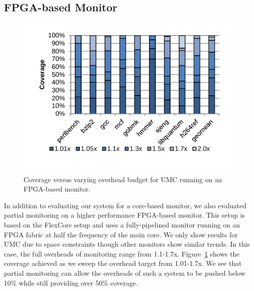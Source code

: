 \subsection{FPGA-based Monitor}
\label{sec:evaluation.fpga}

\begin{figure}
  \begin{center}
    \vspace{-0.1in}
    \includegraphics[width=\linewidth, clip=true, trim=0 0.3in 0 0.1in]{figs/data_fpga_umc_sweep.pdf}
    \vspace{-0.2in}
    \caption{Coverage versus varying overhead budget for UMC running on an FPGA-based monitor.}
    \label{fig:evaluation.fpga_umc_sweep}
    \vspace{-0.1in}
  \end{center}
\end{figure}

In addition to evaluating our system for a core-based monitor, we also
evaluated partial monitoring on a higher performance FPGA-based monitor. This
setup is based on the FlexCore \cite{flexcore-micro10} setup and uses a
fully-pipelined monitor running on an FPGA fabric at half the frequency of the
main core. We only show results for UMC due to space constraints though other
monitors show similar trends. In this case, the full overheads of
monitoring range from 1.1-1.7x. Figure~\ref{fig:evaluation.fpga_umc_sweep} shows
the coverage achieved as we sweep the overhead target from 1.01-1.7x. We see that partial
monitoring can allow the overheads of such a system to be pushed below 10\%
while still providing over 50\% coverage.

